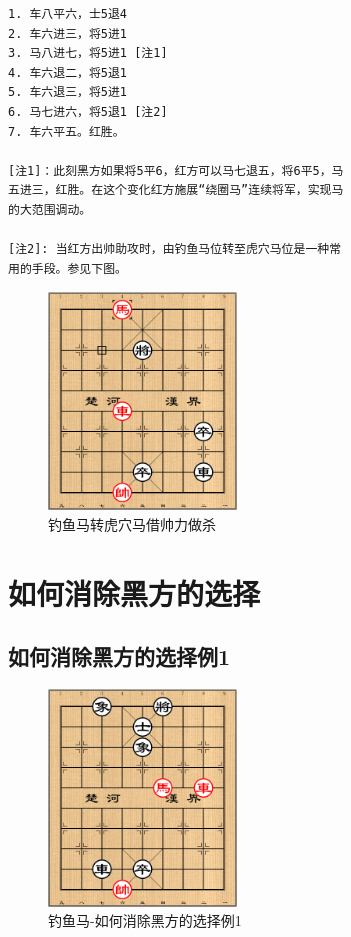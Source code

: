\documentclass[a5paper,twoside]{book}
\begin{document}
\begin{verbatim}
1. 车八平六，士5退4
2. 车六进三，将5进1
3. 马八进七，将5进1 [注1]
4. 车六退二，将5退1
5. 车六退三，将5进1
6. 马七进六，将5退1 [注2]
7. 车六平五。红胜。
      
[注1]：此刻黑方如果将5平6，红方可以马七退五，将6平5，马
五进三，红胜。在这个变化红方施展“绕圈马”连续将军，实现马
的大范围调动。

[注2]: 当红方出帅助攻时，由钓鱼马位转至虎穴马位是一种常
用的手段。参见下图。
\end{verbatim}

\begin{figure}[H]
\centering
\includegraphics[width=5cm]{pic/钓鱼马转虎穴马借帅力做杀.png}
\caption{钓鱼马转虎穴马借帅力做杀}
\end{figure}


\section{如何消除黑方的选择}
\label{sec-3-3}
\subsection{如何消除黑方的选择例1}
\label{sec-3-3-1}
\begin{figure}[H]
\centering
\includegraphics[width=5cm]{pic/钓鱼马-如何消除黑方的选择.png}
\caption{钓鱼马-如何消除黑方的选择例1}
\end{figure}
\end{document}

